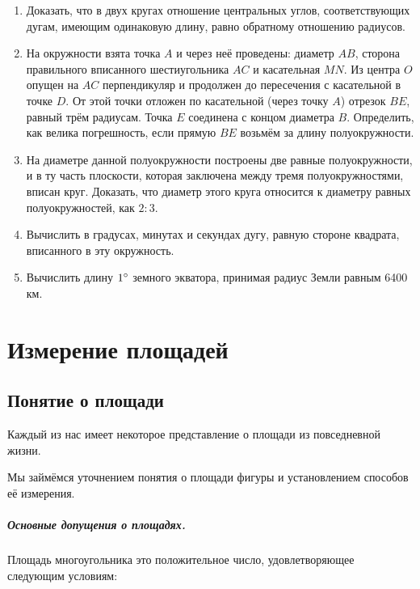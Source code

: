 \documentclass[twoside]{book}
\begin{document}
\begin{enumerate}

 \item
Доказать, что в двух кругах отношение центральных углов, соответствующих дугам, имеющим одинаковую длину, равно обратному отношению радиусов.

 \item
На окружности взята точка $A$ и через неё проведены:
диаметр $AB$, сторона правильного вписанного шестиугольника $AC$ и касательная $MN$.
Из центра $O$ опущен на $AC$ перпендикуляр и продолжен до пересечения с касательной в точке $D$.
От этой точки отложен по касательной (через точку $A$) отрезок $BE$, равный трём радиусам.
Точка $E$ соединена с концом диаметра $B$.
Определить, как велика погрешность, если прямую $BE$ возьмём за длину полуокружности.

 \item
На диаметре данной полуокружности построены две равные полуокружности, и в ту часть плоскости, которая заключена между тремя полуокружностями, вписан круг.
Доказать, что диаметр этого круга относится к диаметру равных полуокружностей, как $2:3$.

 \item
Вычислить в градусах, минутах и секундах дугу, равную стороне квадрата, вписанного в эту окружность.

 \item
Вычислить длину $1\degree$ земного экватора, принимая радиус Земли равным 6400 км.

\end{enumerate}

\chapter{Измерение площадей}

\section{Понятие о площади}

Каждый из нас имеет некоторое представление о площади из повседневной жизни.

Мы займёмся уточнением понятия о площади фигуры и установлением способов её измерения.

\paragraph{Основные допущения о площадях.}\label{1938/243}
Площадь многоугольника это положительное число, удовлетворяющее следующим условиям:
\end{document}
